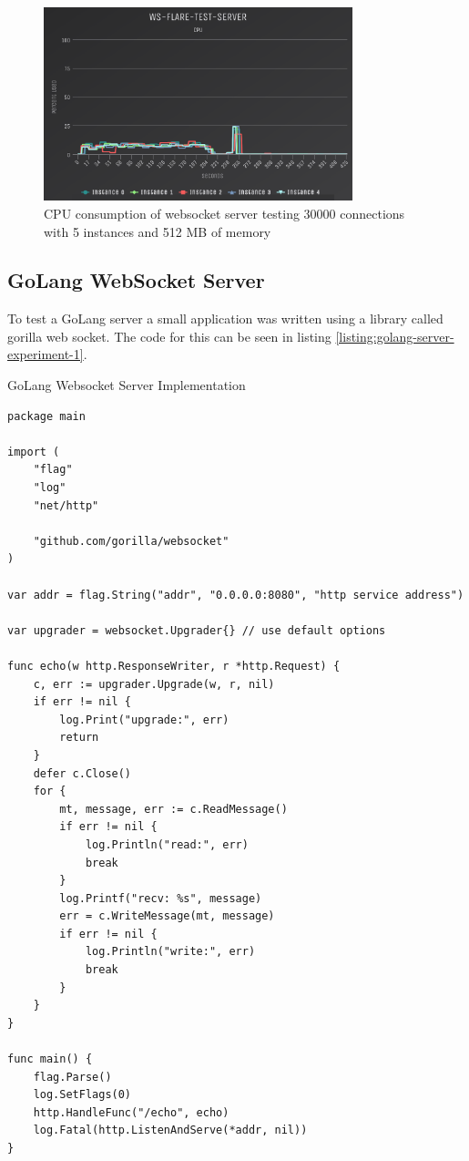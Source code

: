 \begin{figure}[H]
  \centering
    \includegraphics[width=0.8\textwidth]{figures/experiments/experiment-1/node-js/cpu-30000-5-instances-512-memory.png}
    \caption{CPU consumption of websocket server testing 30000 connections with 5 instances and 512 MB of memory}
    \label{fig:experiment-3-cpu-530000000-5-instances-512-mem}
\end{figure}

\subsection{GoLang WebSocket Server}

To test a GoLang server a small application was written using a library called gorilla web socket. The code for this can be seen in listing \ref{listing:golang-server-experiment-1}. 

\begin{listing}[H]
    \caption{GoLang Websocket Server Implementation}
    \label{listing:golang-server-experiment-1}
    \begin{verbatim}
package main

import (
    "flag"
    "log"
    "net/http"

    "github.com/gorilla/websocket"
)

var addr = flag.String("addr", "0.0.0.0:8080", "http service address")

var upgrader = websocket.Upgrader{} // use default options

func echo(w http.ResponseWriter, r *http.Request) {
    c, err := upgrader.Upgrade(w, r, nil)
    if err != nil {
        log.Print("upgrade:", err)
        return
    }
    defer c.Close()
    for {
        mt, message, err := c.ReadMessage()
        if err != nil {
            log.Println("read:", err)
            break
        }
        log.Printf("recv: %s", message)
        err = c.WriteMessage(mt, message)
        if err != nil {
            log.Println("write:", err)
            break
        }
    }
}

func main() {
    flag.Parse()
    log.SetFlags(0)
    http.HandleFunc("/echo", echo)
    log.Fatal(http.ListenAndServe(*addr, nil))
}
\end{verbatim}
\end{listing}

